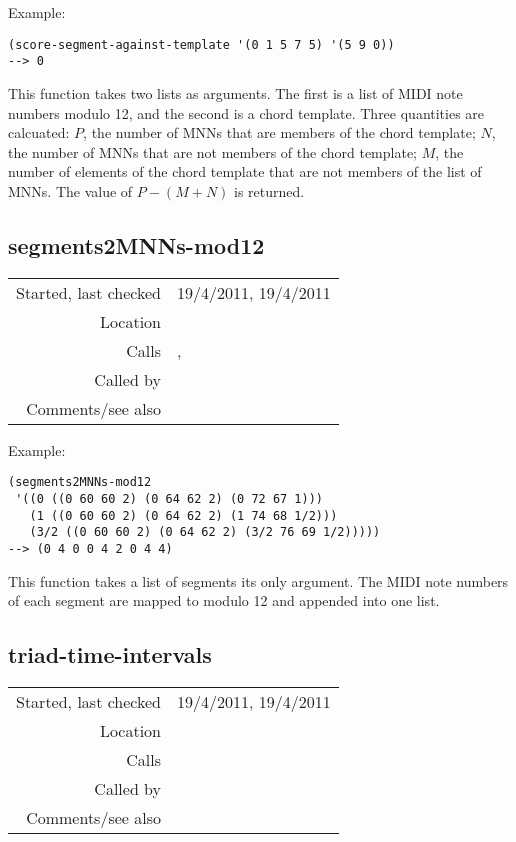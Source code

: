 \vspace{0.5cm}
\noindent Example:
\begin{verbatim}
(score-segment-against-template '(0 1 5 7 5) '(5 9 0))
--> 0
\end{verbatim}

\noindent This function takes two lists as arguments.
The first is a list of MIDI note numbers modulo 12,
and the second is a chord template. Three quantities
are calcuated: $P$, the number of MNNs that are
members of the chord template; $N$, the number of MNNs
that are not members of the chord template; $M$, the
number of elements of the chord template that are not
members of the list of MNNs. The value of
$P - (M + N)$ is returned.


\subsection*{segments2MNNs-mod12}\label{fun:segments2MNNs-mod12}

\vspace{0.3cm}
\begin{tabular}{r|p{8cm}}
Started, last checked & 19/4/2011, 19/4/2011 \\
Location & \nameref{sec:chord-labelling} \\
Calls & \nameref{fun:mod-list}, \nameref{fun:nth-list-of-lists} \\
Called by & \nameref{fun:max-argmax-of-segment-scores} \\
Comments/see also & 
\end{tabular}

\vspace{0.5cm}
\noindent Example:
\begin{verbatim}
(segments2MNNs-mod12
 '((0 ((0 60 60 2) (0 64 62 2) (0 72 67 1)))
   (1 ((0 60 60 2) (0 64 62 2) (1 74 68 1/2)))
   (3/2 ((0 60 60 2) (0 64 62 2) (3/2 76 69 1/2)))))
--> (0 4 0 0 4 2 0 4 4)
\end{verbatim}

\noindent This function takes a list of segments its
only argument. The MIDI note numbers of each segment
are mapped to modulo 12 and appended into one list.


\subsection*{triad-time-intervals}\label{fun:triad-time-intervals}

\vspace{0.3cm}
\begin{tabular}{r|p{8cm}}
Started, last checked & 19/4/2011, 19/4/2011 \\
Location & \nameref{sec:chord-labelling} \\
Calls & \nameref{fun:HarmAn->roman} \\
Called by & \nameref{fun:c@merata2014-question2answer} \\
Comments/see also & 
\end{tabular}

